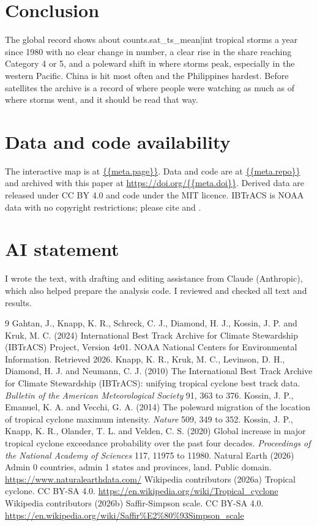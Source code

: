 \documentclass[11pt,a4paper]{article}
\begin{document}
\section{Conclusion}
The global record shows about {{counts.sat_ts_mean|int}} tropical storms a year since 1980 with no clear change in number, a clear rise in the share reaching Category 4 or 5, and a poleward shift in where storms peak, especially in the western Pacific. China is hit most often and the Philippines hardest. Before satellites the archive is a record of where people were watching as much as of where storms went, and it should be read that way.

\section*{Data and code availability}
The interactive map is at \url{{{meta.page}}}. Data and code are at \url{{{meta.repo}}} and archived with this paper at \url{https://doi.org/{{meta.doi}}}. Derived data are released under CC BY 4.0 and code under the MIT licence. IBTrACS is NOAA data with no copyright restrictions; please cite \citet{knapp2010} and \citet{gahtan2024}.

\section*{AI statement}
I wrote the text, with drafting and editing assistance from Claude (Anthropic), which also helped prepare the analysis code. I reviewed and checked all text and results.

\begin{thebibliography}{9}
 Gahtan, J., Knapp, K. R., Schreck, C. J., Diamond, H. J., Kossin, J. P. and Kruk, M. C. (2024) International Best Track Archive for Climate Stewardship (IBTrACS) Project, Version 4r01. NOAA National Centers for Environmental Information. Retrieved 2026.
 Knapp, K. R., Kruk, M. C., Levinson, D. H., Diamond, H. J. and Neumann, C. J. (2010) The International Best Track Archive for Climate Stewardship (IBTrACS): unifying tropical cyclone best track data. \emph{Bulletin of the American Meteorological Society} 91, 363 to 376.
 Kossin, J. P., Emanuel, K. A. and Vecchi, G. A. (2014) The poleward migration of the location of tropical cyclone maximum intensity. \emph{Nature} 509, 349 to 352.
 Kossin, J. P., Knapp, K. R., Olander, T. L. and Velden, C. S. (2020) Global increase in major tropical cyclone exceedance probability over the past four decades. \emph{Proceedings of the National Academy of Sciences} 117, 11975 to 11980.
 Natural Earth (2026) Admin 0 countries, admin 1 states and provinces, land. Public domain. \url{https://www.naturalearthdata.com/}
 Wikipedia contributors (2026a) Tropical cyclone. CC BY-SA 4.0. \url{https://en.wikipedia.org/wiki/Tropical_cyclone}
 Wikipedia contributors (2026b) Saffir-Simpson scale. CC BY-SA 4.0. \url{https://en.wikipedia.org/wiki/Saffir\%E2\%80\%93Simpson_scale}
\end{thebibliography}
\end{document}
